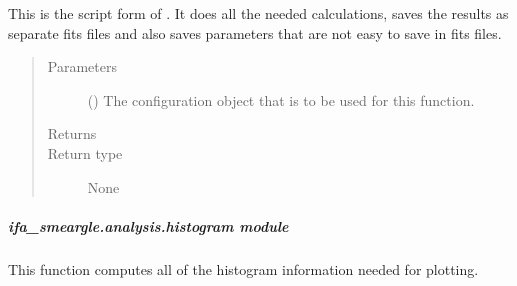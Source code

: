 \documentclass[letterpaper,10pt,english]{sphinxmanual}
\begin{document}

\begin{fulllineitems}
\label{\detokenize{docstrings/ifa_smeargle.analysis.heatmap:ifa_smeargle.analysis.heatmap.script_analysis_heatmap}}
This is the script form of . It does all
the needed calculations, saves the results as separate fits files
and also saves parameters that are not easy to save in fits files.
\begin{quote}\begin{description}
\item[{Parameters}] \leavevmode
{} () \textendash{} The configuration object that is to be used for this
function.

\item[{Returns}] \leavevmode


\item[{Return type}] \leavevmode
None

\end{description}\end{quote}

\end{fulllineitems}



\subparagraph{ifa\_smeargle.analysis.histogram module}
\label{\detokenize{docstrings/ifa_smeargle.analysis.histogram:module-ifa_smeargle.analysis.histogram}}\label{\detokenize{docstrings/ifa_smeargle.analysis.histogram:ifa-smeargle-analysis-histogram-module}}\label{\detokenize{docstrings/ifa_smeargle.analysis.histogram::doc}}
This function computes all of the histogram information needed for
plotting.
\end{document}
